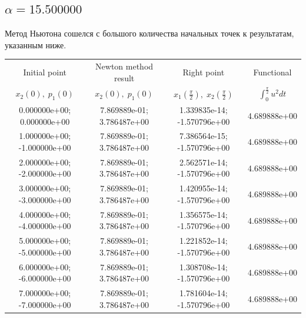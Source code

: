 \documentclass[titlepage]{article}
\def\l{\left}
\def\r{\right}
\begin{document}
\subsection{$\alpha = 15.500000$} 
Метод Ньютона сошелся с большого количества начальных точек к результатам, указанным ниже. \\ 
\begin{tabular}{ | c | c | c | c |} 
\hline 
Initial point  & Newton method result & Right point & Functional 
 \\ $x_2(0), \; p_1(0)$ & $x_2(0), \; p_1(0)$ & $x_1\l(\frac{\pi}{2}\r), \; x_2\l(\frac{\pi}{2}\r)$ & $\int_{0}^{\frac{\pi}{2}}u^2dt$  \\ \hline 
0.000000e+00; 0.000000e+00 & 7.869889e-01; 3.786487e+00 & 1.339835e-14; -1.570796e+00 & 4.689888e+00 \\ \hline 
1.000000e+00; -1.000000e+00 & 7.869889e-01; 3.786487e+00 & 7.386564e-15; -1.570796e+00 & 4.689888e+00 \\ \hline 
2.000000e+00; -2.000000e+00 & 7.869889e-01; 3.786487e+00 & 2.562571e-14; -1.570796e+00 & 4.689888e+00 \\ \hline 
3.000000e+00; -3.000000e+00 & 7.869889e-01; 3.786487e+00 & 1.420955e-14; -1.570796e+00 & 4.689888e+00 \\ \hline 
4.000000e+00; -4.000000e+00 & 7.869889e-01; 3.786487e+00 & 1.356575e-14; -1.570796e+00 & 4.689888e+00 \\ \hline 
5.000000e+00; -5.000000e+00 & 7.869889e-01; 3.786487e+00 & 1.221852e-14; -1.570796e+00 & 4.689888e+00 \\ \hline 
6.000000e+00; -6.000000e+00 & 7.869889e-01; 3.786487e+00 & 1.308708e-14; -1.570796e+00 & 4.689888e+00 \\ \hline 
7.000000e+00; -7.000000e+00 & 7.869889e-01; 3.786487e+00 & 1.781604e-14; -1.570796e+00 & 4.689888e+00 \\ \hline 
\end{tabular} 
\end{document}
